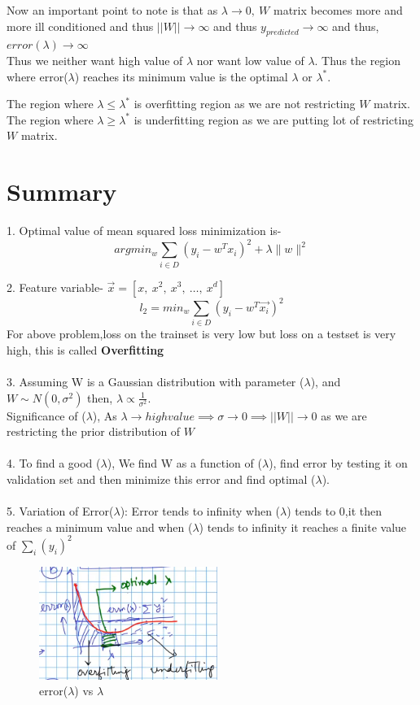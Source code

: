 \documentclass[11pt, twosides]{article}
\begin{document}
\begin{flushleft}
Now an important point to note is that as $\lambda \rightarrow 0, \ W$ matrix becomes more and more ill conditioned and thus $||W||\rightarrow \infty$ and thus $y_{predicted} \rightarrow \infty$ and thus, $error(\lambda) \rightarrow \infty$
\\

Thus we neither want high value of $\lambda$ nor want low value of $\lambda$. Thus the region where error($\lambda$) reaches its minimum value is the optimal $\lambda$ or $\lambda^*$.

The region where $\lambda \leq \lambda^*$ is overfitting region as we are not restricting $W$ matrix. The region where $\lambda \geq \lambda^*$ is underfitting region as we are putting lot of restricting $W$ matrix. 
\end{flushleft}

\newpage
\section{Summary}

1. Optimal value of mean squared loss minimization is-
$$ argmin_w \sum_{i \in D} (y_i- w^Tx_i)^2 + \lambda \|w\|^2$$

2. Feature variable- $ \overrightarrow{x} = [x,\ x^2,\ x^3,\ \ldots,\ x^d]$
$$l_2 = min_w \sum_{i \in D} (y_i-w^T\overrightarrow{x_i})^2$$
For above problem,loss on the trainset is very low but loss on a testset is very high, this is called \textbf{Overfitting}\\
\\
3. Assuming W is a Gaussian distribution with parameter ($\lambda$), and $W \sim N(0,\sigma^2)$ then, $\lambda \propto \frac{1}{\sigma^2}$.\\
Significance of ($\lambda$), As $\lambda \rightarrow high value \implies \sigma \rightarrow 0 \implies ||W|| \rightarrow 0$ as we are restricting the prior distribution of $W$\\
\\
4. To find a good ($\lambda$), We find W as a function of ($\lambda$), find error by testing it on validation set and then minimize this error and find optimal ($\lambda$).\\
\\
5. Variation of Error($\lambda$): Error tends to infinity when ($\lambda$) tends to 0,it then reaches a minimum value and when ($\lambda$) tends to infinity it reaches a finite value of $\sum_i (y_i)^2 $
\begin{figure}[h]
    \centering
    \includegraphics[width = 5.8cm]{Model complexity.png}
    \caption{error($\lambda$) vs $\lambda$}
\end{figure}
\end{document}
